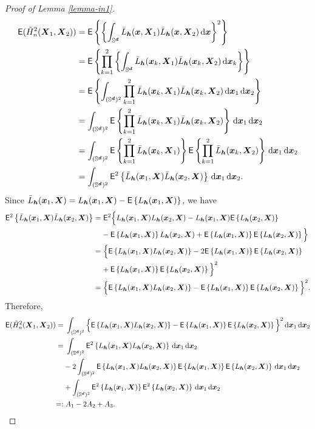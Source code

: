 \documentclass[oneside,11pt]{article}
\begin{document}
\begin{proof}[Proof of Lemma \ref{lemma-in1}]
\begin{align*}
    \mathsf{E} ( \tilde{H}_n^2(\bX_1, \bX_2)) &= \mathsf{E}\lrb{ \lrb{\int_{\Sr} \bar{L}_{\bh} (\bx,\bX_1) \bar{L}_{\bh} (\bx,\bX_2) \,\rd \bx}^2 } \\
    &= \mathsf{E}\lrb{ \prod_{k=1}^{2} \lrb{\int_{\Sr} \bar{L}_{\bh} (\bx_k,\bX_1) \bar{L}_{\bh} (\bx_k,\bX_2) \,\rd \bx_k} } \\ 
    &= \mathsf{E} \lrb{\int_{(\Sr)^2} \prod_{k=1}^{2}\bar{L}_{\bh} (\bx_k,\bX_1) \bar{L}_{\bh} (\bx_k,\bX_2) \,\rd \bx_1 \,\rd \bx_2}  \\
    &= \int_{(\Sr)^2} \mathsf{E} \lrb{ \prod_{k=1}^{2}\bar{L}_{\bh} (\bx_k,\bX_1) \bar{L}_{\bh} (\bx_k,\bX_2) } \,\rd \bx_1 \,\rd \bx_2 \\
    &= \int_{(\Sr)^2} \mathsf{E} \lrb{ \prod_{k=1}^{2}\bar{L}_{\bh} (\bx_k,\bX_1)} \mathsf{E} \lrb{ \prod_{k=1}^{2} \bar{L}_{\bh} (\bx_k,\bX_2) } \,\rd \bx_1 \,\rd \bx_2  \\
    &= \int_{(\Sr)^2} \mathsf{E}^2 \lrb{ \bar{L}_{\bh} (\bx_1,\bX) \bar{L}_{\bh} (\bx_2,\bX)} \,\rd \bx_1 \,\rd \bx_2.
\end{align*}
Since $\bar{L}_{\bh} (\bx_1,\bX)=L_{\bh} (\bx_1,\bX)-\mathsf{E}\lrb{L_{\bh} (\bx_1,\bX)}$, we have
\begin{align*}
    \mathsf{E}^2 \lrb{ \bar{L}_{\bh} (\bx_1,\bX) \bar{L}_{\bh} (\bx_2,\bX)} =&\; \mathsf{E}^2 \Big\{{L}_{\bh} (\bx_1,\bX){L}_{\bh} (\bx_2,\bX) - {L}_{\bh} (\bx_1,\bX)\mathsf{E}\lrb{{L}_{\bh} (\bx_2,\bX)}\\
    &- \mathsf{E} \lrb{{L}_{\bh} (\bx_1,\bX)} {L}_{\bh} (\bx_2,\bX) +  \mathsf{E} \lrb{{L}_{\bh} (\bx_1,\bX)} \mathsf{E} \lrb{{L}_{\bh} (\bx_2,\bX)}\Big\}\\
    =&\; \Big\{\mathsf{E} \lrb{{L}_{\bh} (\bx_1,\bX){L}_{\bh} (\bx_2,\bX)} - 2\mathsf{E}\lrb{{L}_{\bh} (\bx_1,\bX)}\mathsf{E}\lrb{{L}_{\bh} (\bx_2,\bX)}\\
    &+  \mathsf{E} \lrb{{L}_{\bh} (\bx_1,\bX)} \mathsf{E} \lrb{{L}_{\bh} (\bx_2,\bX)}\Big\}^2\\
    =&\; \Big\{\mathsf{E} \lrb{{L}_{\bh} (\bx_1,\bX){L}_{\bh} (\bx_2,\bX)} - \mathsf{E}\lrb{{L}_{\bh} (\bx_1,\bX)}\mathsf{E}\lrb{{L}_{\bh} (\bx_2,\bX)}\Big\}^2.
\end{align*}
Therefore,
\begin{align*}
    \mathsf{E} ( \tilde{H}_n^2(\bX_1, \bX_2)) =&\; \int_{(\Sr)^2} \Big\{\mathsf{E} \lrb{{L}_{\bh} (\bx_1,\bX){L}_{\bh} (\bx_2,\bX)} - \mathsf{E}\lrb{{L}_{\bh} (\bx_1,\bX)}\mathsf{E}\lrb{{L}_{\bh} (\bx_2,\bX)}\Big\}^2\,\rd \bx_1 \,\rd \bx_2\\
    =&\; \int_{(\Sr)^2} \mathsf{E}^2 \lrb{{L}_{\bh} (\bx_1,\bX){L}_{\bh} (\bx_2,\bX)}\,\rd \bx_1 \,\rd \bx_2\\
    &-2\int_{(\Sr)^2} \mathsf{E} \lrb{{L}_{\bh} (\bx_1,\bX){L}_{\bh} (\bx_2,\bX)}\mathsf{E}\lrb{{L}_{\bh} (\bx_1,\bX)}\mathsf{E}\lrb{{L}_{\bh} (\bx_2,\bX)} \,\rd \bx_1 \,\rd \bx_2\\
    &+ \int_{(\Sr)^2}\mathsf{E}^2\lrb{{L}_{\bh} (\bx_1,\bX)}\mathsf{E}^2\lrb{{L}_{\bh} (\bx_2,\bX)}\,\rd \bx_1 \,\rd \bx_2\\
    \indef&\; A_1-2A_2+A_3.
\end{align*}


\end{proof}
\end{document}
